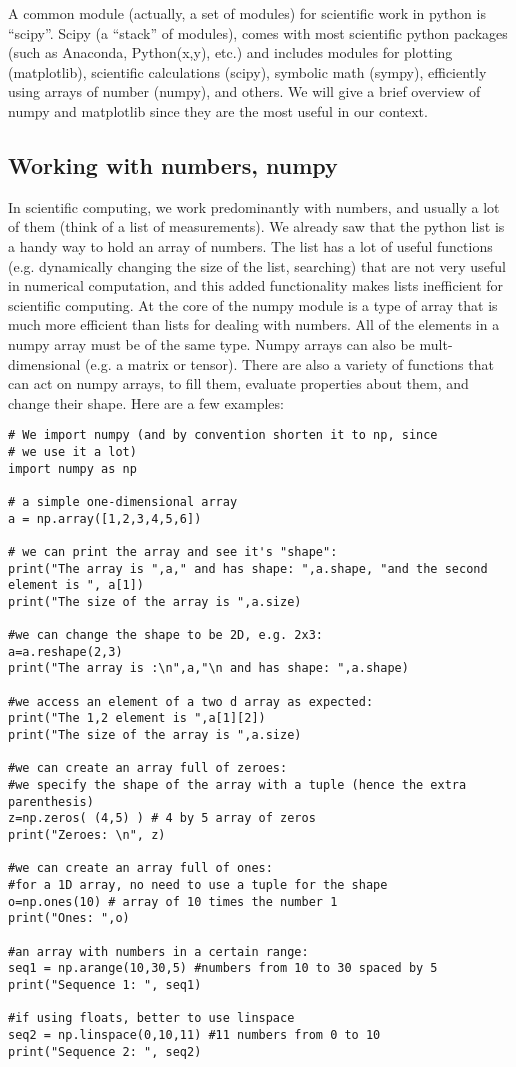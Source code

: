 A common module (actually, a set of modules) for scientific work in python is ``scipy''. Scipy (a ``stack'' of modules), comes with most scientific python packages (such as Anaconda, Python(x,y), etc.) and includes modules for plotting (matplotlib), scientific calculations (scipy), symbolic math (sympy), efficiently using arrays of number (numpy), and others. We will give a brief overview of numpy and matplotlib since they are the most useful in our context.

\subsection{Working with numbers, numpy}
In scientific computing, we work predominantly with numbers, and usually a lot of them (think of a list of measurements). We already saw that the python list is a handy way to hold an array of numbers. The list has a lot of useful functions (e.g. dynamically changing the size of the list, searching) that are not very useful in numerical computation, and this added functionality makes lists inefficient for scientific computing. At the core of the numpy module is a type of array that is much more efficient than lists for dealing with numbers. All of the elements in a numpy array must be of the same type. Numpy arrays can also be mult-dimensional (e.g. a matrix or tensor). There are also a variety of functions that can act on numpy arrays, to fill them, evaluate properties about them, and change their shape. Here are a few examples:

\begin{lstlisting}[frame=single] 
# We import numpy (and by convention shorten it to np, since
# we use it a lot)
import numpy as np

# a simple one-dimensional array
a = np.array([1,2,3,4,5,6])

# we can print the array and see it's "shape":
print("The array is ",a," and has shape: ",a.shape, "and the second element is ", a[1])
print("The size of the array is ",a.size)

#we can change the shape to be 2D, e.g. 2x3:
a=a.reshape(2,3)
print("The array is :\n",a,"\n and has shape: ",a.shape)

#we access an element of a two d array as expected:
print("The 1,2 element is ",a[1][2])
print("The size of the array is ",a.size)

#we can create an array full of zeroes:
#we specify the shape of the array with a tuple (hence the extra parenthesis)
z=np.zeros( (4,5) ) # 4 by 5 array of zeros
print("Zeroes: \n", z)

#we can create an array full of ones:
#for a 1D array, no need to use a tuple for the shape
o=np.ones(10) # array of 10 times the number 1
print("Ones: ",o)

#an array with numbers in a certain range:
seq1 = np.arange(10,30,5) #numbers from 10 to 30 spaced by 5
print("Sequence 1: ", seq1)

#if using floats, better to use linspace
seq2 = np.linspace(0,10,11) #11 numbers from 0 to 10
print("Sequence 2: ", seq2)
\end{lstlisting} 

